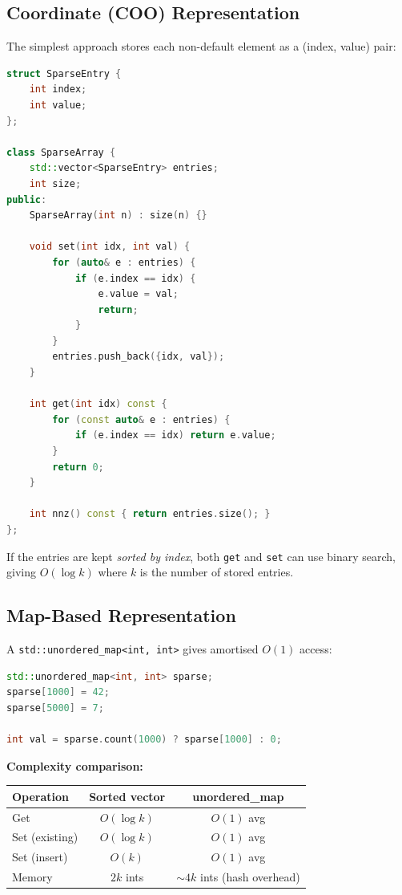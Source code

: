 \subsection{Coordinate (COO) Representation}

The simplest approach stores each non-default element as a (index, value) pair:

\begin{lstlisting}[language=C++]
struct SparseEntry {
    int index;
    int value;
};

class SparseArray {
    std::vector<SparseEntry> entries;
    int size;
public:
    SparseArray(int n) : size(n) {}

    void set(int idx, int val) {
        for (auto& e : entries) {
            if (e.index == idx) {
                e.value = val;
                return;
            }
        }
        entries.push_back({idx, val});
    }

    int get(int idx) const {
        for (const auto& e : entries) {
            if (e.index == idx) return e.value;
        }
        return 0;
    }

    int nnz() const { return entries.size(); }
};
\end{lstlisting}

If the entries are kept \emph{sorted by index}, both \texttt{get} and \texttt{set} can use binary search, giving $O(\log k)$ where $k$ is the number of stored entries.

\subsection{Map-Based Representation}

A \texttt{std::unordered\_map<int, int>} gives amortised $O(1)$ access:

\begin{lstlisting}[language=C++]
std::unordered_map<int, int> sparse;
sparse[1000] = 42;
sparse[5000] = 7;

int val = sparse.count(1000) ? sparse[1000] : 0;
\end{lstlisting}

\textbf{Complexity comparison:}

\begin{center}
\begin{tabular}{lcc}
\toprule
Operation & Sorted vector & unordered\_map \\
\midrule
Get & $O(\log k)$ & $O(1)$ avg \\
Set (existing) & $O(\log k)$ & $O(1)$ avg \\
Set (insert) & $O(k)$ & $O(1)$ avg \\
Memory & $2k$ ints & $\sim 4k$ ints (hash overhead) \\
\bottomrule
\end{tabular}
\end{center}

